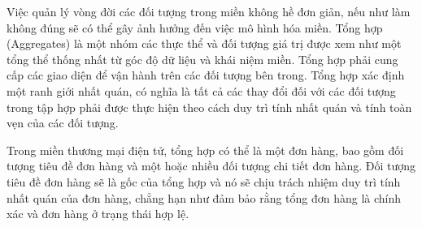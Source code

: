Việc quản lý vòng đời các đối tượng trong miền không hề đơn giản, nếu như làm không đúng sẽ có thể gây ảnh hưởng đến việc mô hình hóa miền.       Tổng hợp  (Aggregates)         là một nhóm các thực thể và đối tượng giá trị được xem như một tổng thể thống nhất từ góc độ dữ liệu và khái niệm miền.     Tổng hợp  phải cung cấp các giao diện để vận hành trên các đối tượng bên trong.    Tổng hợp   xác định một ranh giới nhất quán, có nghĩa là tất cả các thay đổi đối với các đối tượng trong tập hợp phải được thực hiện theo cách duy trì tính nhất quán và tính toàn vẹn của các đối tượng.


\begin{example}   Trong miền thương mại điện tử, tổng hợp có thể là một đơn hàng, bao gồm đối tượng tiêu đề đơn hàng và một hoặc nhiều đối tượng chi tiết đơn hàng. Đối tượng tiêu đề đơn hàng sẽ là gốc của tổng hợp và nó sẽ chịu trách nhiệm duy trì tính nhất quán của đơn hàng, chẳng hạn như đảm bảo rằng tổng đơn hàng là chính xác và đơn hàng ở trạng thái hợp lệ.
    
\end{example}











